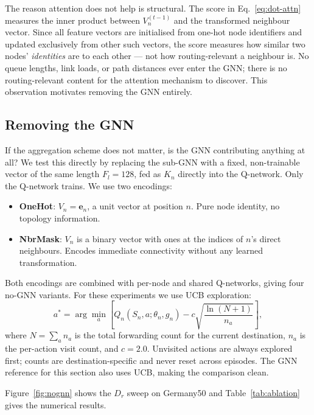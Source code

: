 \documentclass[10pt,twocolumn,letterpaper]{article}
\begin{document}
The reason attention does not help is structural. The score in
Eq.~\eqref{eq:dot-attn} measures the inner product between
$V_n^{(t-1)}$ and the transformed neighbour vector. Since all feature
vectors are initialised from one-hot node identifiers and updated
exclusively from other such vectors, the score measures how similar two
nodes' \emph{identities} are to each other --- not how routing-relevant
a neighbour is. No queue lengths, link loads, or path distances ever
enter the GNN; there is no routing-relevant content for the attention
mechanism to discover. This observation motivates removing the GNN
entirely.

\subsection{Removing the GNN}
\label{sec:nognn}

If the aggregation scheme does not matter, is the GNN contributing
anything at all? We test this directly by replacing the sub-GNN with a
fixed, non-trainable vector of the same length $F_l = 128$, fed as
$K_n$ directly into the Q-network. Only the Q-network trains. We use
two encodings:
\begin{itemize}
  \item \textbf{OneHot}: $V_n = \mathbf{e}_n$, a unit vector at
    position $n$. Pure node identity, no topology information.
  \item \textbf{NbrMask}: $V_n$ is a binary vector with ones at the
    indices of $n$'s direct neighbours. Encodes immediate connectivity
    without any learned transformation.
\end{itemize}

Both encodings are combined with per-node and shared Q-networks, giving
four no-GNN variants. For these experiments we use UCB exploration:
\begin{equation}
  a^* = \arg\min_a \!\left[
    Q_n(S_n, a;\theta_n, g_n) - c\sqrt{\frac{\ln(N+1)}{n_a}}
  \right],
  \label{eq:ucb-full}
\end{equation}
where $N = \sum_a n_a$ is the total forwarding count for the current
destination, $n_a$ is the per-action visit count, and $c = 2.0$.
Unvisited actions are always explored first; counts are
destination-specific and never reset across episodes. The GNN reference
for this section also uses UCB, making the comparison clean.

Figure~\ref{fig:nognn} shows the $D_r$ sweep on Germany50 and
Table~\ref{tab:ablation} gives the numerical results.
\end{document}
